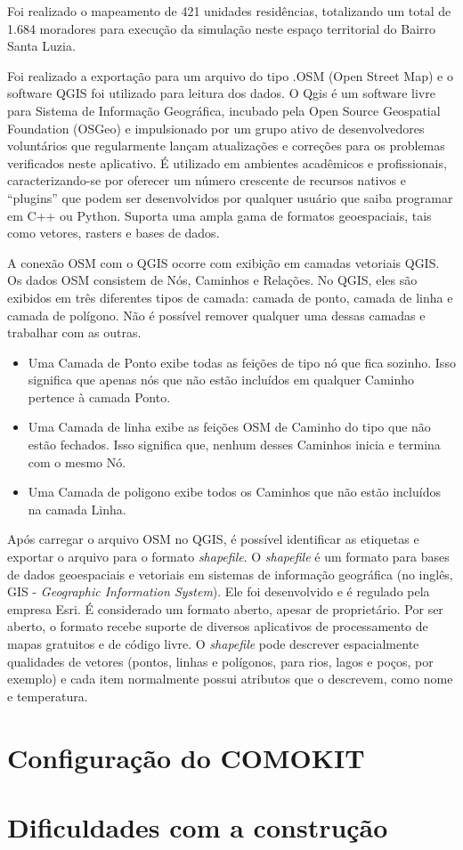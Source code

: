 Foi realizado o mapeamento de 421 unidades residências, totalizando um total de 1.684 moradores para execução da simulação neste espaço territorial do Bairro Santa Luzia.

Foi realizado a exportação para um arquivo do tipo .OSM (Open Street Map) e o software QGIS foi utilizado para leitura dos dados. O Qgis é um software livre para Sistema de Informação Geográfica, incubado pela Open Source Geospatial Foundation (OSGeo) e impulsionado por um grupo ativo de desenvolvedores voluntários que regularmente lançam atualizações e correções para os problemas verificados neste aplicativo. É utilizado em ambientes acadêmicos e profissionais, caracterizando-se por oferecer um número crescente de recursos nativos e “plugins” que podem ser desenvolvidos por qualquer usuário que saiba programar em C++ ou Python. Suporta uma ampla gama de formatos geoespaciais, tais como vetores, rasters e bases de dados. \cite{bruno2017aplicabilidade}

A conexão OSM com o QGIS ocorre com exibição em camadas vetoriais QGIS. Os dados OSM consistem de Nós, Caminhos e Relações. No QGIS, eles são exibidos em três diferentes tipos de camada: camada de ponto, camada de linha e camada de polígono. Não é possível remover qualquer uma dessas camadas e trabalhar com as outras. \cite{OpenStre2:online}

\begin{itemize}
\item Uma Camada de Ponto exibe todas as feições de tipo nó que fica sozinho. Isso significa que apenas nós que não estão incluídos em qualquer Caminho pertence à camada Ponto.
\item Uma Camada de linha exibe as feições OSM de Caminho do tipo que não estão fechados. Isso significa que, nenhum desses Caminhos inicia e termina com o mesmo Nó.
\item Uma Camada de poligono exibe todos os Caminhos que não estão incluídos na camada Linha.
\end{itemize}

Após carregar o arquivo OSM no QGIS, é possível identificar as etiquetas e exportar o arquivo para o formato \textit{shapefile}. O \textit{shapefile} é um formato para bases de dados geoespaciais e vetoriais em sistemas de informação geográfica (no inglês, GIS - \textit{Geographic Information System}). Ele foi desenvolvido e é regulado pela empresa Esri. É considerado um formato aberto, apesar de proprietário. Por ser aberto, o formato recebe suporte de diversos aplicativos de processamento de mapas gratuitos e de código livre. O \textit{shapefile} pode descrever espacialmente qualidades de vetores (pontos, linhas e polígonos, para rios, lagos e poços, por exemplo) e cada item normalmente possui atributos que o descrevem, como nome e temperatura. \cite{41Format2:online}







\section{Configuração do COMOKIT}
\section{Dificuldades com a construção}

